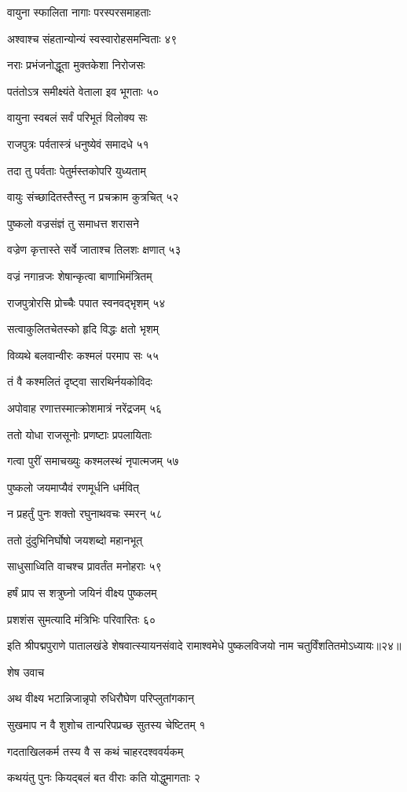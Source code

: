 वायुना स्फालिता नागाः परस्परसमाहताः

अश्वाश्च संहतान्योन्यं स्वस्वारोहसमन्विताः ४९

नराः प्रभंजनोद्धूता मुक्तकेशा निरोजसः

पतंतोऽत्र समीक्ष्यंते वेताला इव भूगताः ५०

वायुना स्वबलं सर्वं परिभूतं विलोक्य सः

राजपुत्रः पर्वतास्त्रं धनुष्येवं समादधे ५१

तदा तु पर्वताः पेतुर्मस्तकोपरि युध्यताम्

वायुः संच्छादितस्तैस्तु न प्रचक्राम कुत्रचित् ५२

पुष्कलो वज्रसंज्ञं तु समाधत्त शरासने

वज्रेण कृत्तास्ते सर्वे जाताश्च तिलशः क्षणात् ५३

वज्रं नगान्रजः शेषान्कृत्वा बाणाभिमंत्रितम्

राजपुत्रोरसि प्रोच्चैः पपात स्वनवद्भृशम् ५४

सत्वाकुलितचेतस्को हृदि विद्धः क्षतो भृशम्

विव्यथे बलवान्वीरः कश्मलं परमाप सः ५५

तं वै कश्मलितं दृष्ट्वा सारथिर्नयकोविदः

अपोवाह रणात्तस्मात्क्रोशमात्रं नरेंद्रजम् ५६

ततो योधा राजसूनोः प्रणष्टाः प्रपलायिताः

गत्वा पुरीं समाचख्युः कश्मलस्थं नृपात्मजम् ५७

पुष्कलो जयमाप्यैवं रणमूर्धनि धर्मवित्

न प्रहर्तुं पुनः शक्तो रघुनाथवचः स्मरन् ५८

ततो दुंदुभिनिर्घोषो जयशब्दो महानभूत्

साधुसाध्विति वाचश्च प्रावर्तंत मनोहराः ५९

हर्षं प्राप स शत्रुघ्नो जयिनं वीक्ष्य पुष्कलम्

प्रशशंस सुमत्यादि मंत्रिभिः परिवारितः ६०

इति श्रीपद्मपुराणे पातालखंडे शेषवात्स्यायनसंवादे रामाश्वमेधे पुष्कलविजयो नाम चतुर्विंशतितमोऽध्यायः॥२४॥


शेष उवाच

अथ वीक्ष्य भटान्निजान्नृपो रुधिरौघेण परिप्लुतांगकान्

सुखमाप न वै शुशोच तान्परिपप्रच्छ सुतस्य चेष्टितम् १

गदताखिलकर्म तस्य वै स कथं चाहरदश्ववर्यकम्

कथयंतु पुनः कियद्बलं बत वीराः कति योद्धुमागताः २


